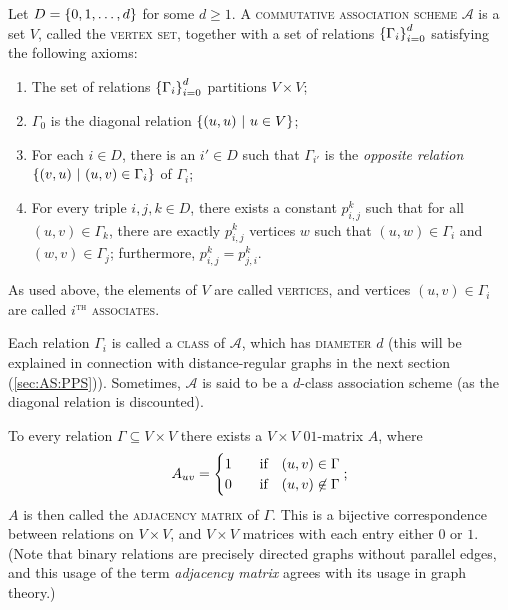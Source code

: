 \documentclass{report}
\newcommand{\AS}{\mathcal{A}}
\begin{document}
    \begin{defn}
      \label{defn:association-scheme-comb}
      Let $D = \left\lbrace 0, 1, \ldots, d \right\rbrace$ for some $d \geq 1$.
      A \textsc{commutative association scheme} $\AS$ is a set $V$, called the
      \textsc{vertex set}, together with a set of relations $\left\lbrace \Gamma_i \right\rbrace_{i=0}^d$
      satisfying the following axioms:
      \begin{enumerate}
        \item The set of relations $\left\lbrace \Gamma_i \right\rbrace_{i=0}^d$ partitions $V \times
          V$;
          \label{ax:cAS-part}
        \item $\Gamma_0$ is the diagonal relation $\left\lbrace  (u, u) \ \middle| \ u \in V  \right\rbrace$;
          \label{ax:cAS-diag}
        \item For each $i \in D$, there is an $i' \in D$ such that $\Gamma_{i'}$ is
          the \textit{opposite relation} $\left\lbrace  (v, u) \ \middle| \ (u, v) \in \Gamma_i  \right\rbrace$ of
          $\Gamma_i$;
          \label{ax:cAS-sym}
        \item For every triple $i, j, k \in D$, there exists a constant $p_{i,
          j}^k$ such that for all $(u, v) \in \Gamma_k$, there are exactly $p_{i,
          j}^k$ vertices $w$ such that $(u, w) \in \Gamma_i$ and $(w, v) \in
          \Gamma_j$;
          furthermore, $p_{i, j}^k = p_{j, i}^k$.
          \label{ax:cAS-reg}
      \end{enumerate}

      As used above, the elements of $V$ are called \textsc{vertices},
      and vertices $(u, v) \in \Gamma_i$ are called \textsc{$i^\text{th}$ associates}.

      Each relation $\Gamma_i$ is called a \textsc{class} of $\AS$, which has
      \textsc{diameter} $d$ (this will be explained in connection with
      distance-regular graphs in the next section (\ref{sec:AS:PPS})).
      Sometimes, $\AS$ is said to be a $d$-class association scheme (as the
      diagonal relation is discounted).
    \end{defn}

    To every relation $\Gamma \subseteq V \times V$ there exists a $V \times V$
    $01$-matrix $A$, where
    \begin{equation}\label{eqn:adjacency-matrix}
      A_{uv} = \begin{cases}
        1 & \quad\text{if}\quad (u, v) \in \Gamma \\
        0 & \quad\text{if}\quad (u, v) \not\in \Gamma \\
      \end{cases};
    \end{equation}
    $A$ is then called the \textsc{adjacency matrix} of $\Gamma$.
    This is a bijective correspondence between relations on $V \times V$,
    and $V \times V$ matrices with each entry either $0$ or $1$.
    (Note that binary relations are precisely directed graphs without parallel
    edges, and this usage of the term \textit{adjacency matrix} agrees with its
    usage in graph theory.)
\end{document}
